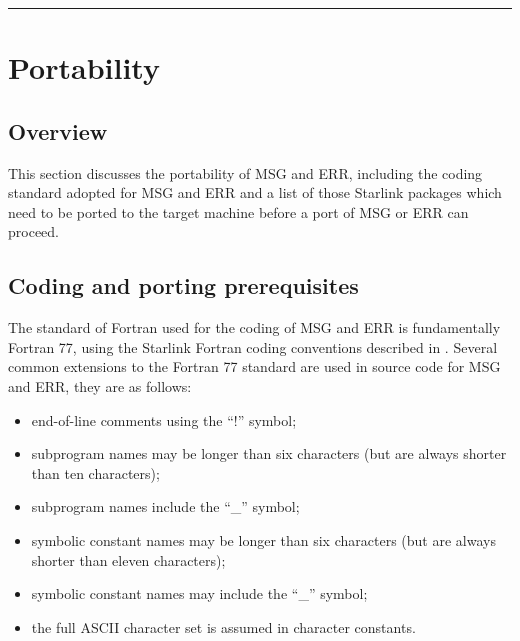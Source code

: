 \documentclass[twoside,11pt]{starlink}
\begin{document}

\rule{\textwidth}{0.5mm}
\normalsize
\newpage
\section{Portability}

\subsection{Overview}

This section discusses the portability of MSG and ERR, including the coding
standard adopted for MSG and ERR and a list of those Starlink packages which
need to be ported to the target machine before a port of MSG or ERR can proceed.


\subsection{Coding and porting prerequisites}

The standard of Fortran used for the coding of MSG and ERR is fundamentally
Fortran 77, using the Starlink Fortran coding conventions described in
.
Several common extensions to the Fortran 77 standard are used in source
code for MSG and ERR, they are as follows:

\begin {itemize}
\item end-of-line comments using the ``!'' symbol;
\item subprogram names may be longer than six characters (but are
always shorter than ten characters);
\item subprogram names include the ``\_'' symbol;
\item symbolic constant names may be longer than six characters (but are always
shorter than eleven characters);
\item symbolic constant names may include the ``\_'' symbol;
\item the full ASCII character set is assumed in character constants.
\end {itemize}
\end{document}
